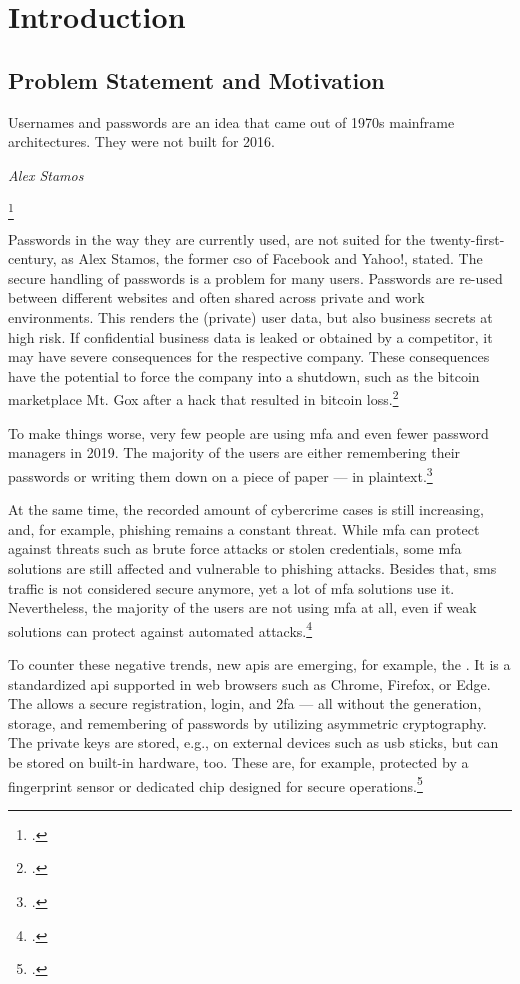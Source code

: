 \chapter{Introduction}
\label{chapter:introduction}

\section{Problem Statement and Motivation}

\setlength{}
\epigraph{\frqq Usernames and passwords are an idea that came out of 1970s mainframe architectures. They were not built for 2016.\flqq\footnotemark}{\textit{Alex Stamos}}
\footcitetext{stamos}

Passwords in the way they are currently used, are not suited for the twenty-first-century, as Alex Stamos, the former \gls{cso} of Facebook and Yahoo!, stated. The secure handling of passwords is a problem for many users. Passwords are re-used between different websites and often shared across private and work environments. This renders the (private) user data, but also business secrets at high risk. If confidential business data is leaked or obtained by a competitor, it may have severe consequences for the respective company. These consequences have the potential to force the company into a shutdown, such as the bitcoin marketplace Mt. Gox after a hack that resulted in bitcoin loss.\footcites[See][43]{rosenberger2018bitcoin}

To make things worse, very few people are using \gls{mfa} and even fewer password managers in 2019. The majority of the users are either remembering their passwords or writing them down on a piece of paper --- in plaintext.\footcites[See][]{ibm-security}[See][]{web-de-passwords}

At the same time, the recorded amount of cybercrime cases is still increasing, and, for example, phishing remains a constant threat. While \gls{mfa} can protect against threats such as brute force attacks or stolen credentials, some \gls{mfa} solutions are still affected and vulnerable to phishing attacks. Besides that, \gls{sms} traffic is not considered secure anymore, yet a lot of \gls{mfa} solutions use it. Nevertheless, the majority of the users are not using \gls{mfa} at all, even if weak solutions can protect against automated attacks.\footcites[See][]{infratest-dimap}[See][6--7]{bka-cybercrime}[See][58]{dotson2019practical}[See][2]{Doerfler:2019:ELC:3308558.3313481}

To counter these negative trends, new \glspl{api} are emerging, for example, the \wa. It is a standardized \gls{api} supported in web browsers such as Chrome, Firefox, or Edge. The \wa{} allows a secure registration, login, and \gls{2fa} --- all without the generation, storage, and remembering of passwords by utilizing asymmetric cryptography. The private keys are stored, e.g., on external devices such as \gls{usb} sticks, but can be stored on built-in hardware, too. These are, for example, protected by a fingerprint sensor or dedicated chip designed for secure operations.\footcites[See][Chapter 1]{w3c}

